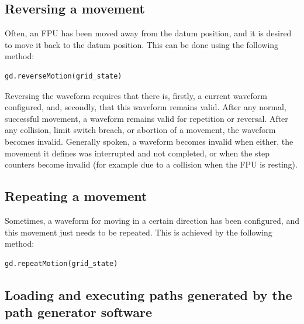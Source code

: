 \documentclass[11pt,a4paper]{scrartcl}
\begin{document}
\subsection{Reversing a movement}
Often, an FPU has been moved away from the datum position, and it is
desired to move it back to the datum position.  This can be done using
the following method:

\begin{verbatim}
gd.reverseMotion(grid_state)
\end{verbatim}

Reversing the waveform requires that there is, firstly, a current
waveform configured, and, secondly, that this waveform remains valid.
After any normal, successful movement, a waveform remains valid for
repetition or reversal. After any collision, limit switch breach, or
abortion of a movement, the waveform becomes invalid. Generally
spoken, a waveform becomes invalid when either, the movement it
defines was interrupted and not completed, or when the step counters
become invalid (for example due to a collision when the FPU is
resting).


\subsection{Repeating a movement}
Sometimes, a waveform for moving in a certain direction has been
configured, and this movement just needs to be repeated.  This is
achieved by the following method:

\begin{verbatim}
gd.repeatMotion(grid_state)
\end{verbatim}

\subsection{Loading and executing paths generated by the path generator software}
\label{sec:loadingpaths}
%
%
%
%
%
%
%
%
%
%
\end{document}

